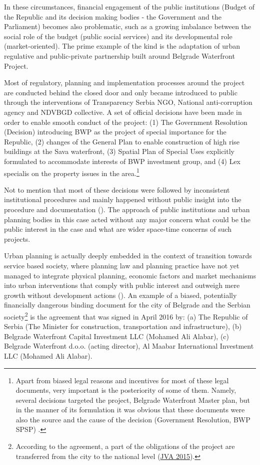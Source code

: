 \documentclass[11pt]{report}
\begin{document}
In these circumstances, financial engagement of the public institutions (Budget of the Republic and its decision making bodies - the Government and the Parliament) becomes also problematic, such as a growing imbalance between the social role of the budget (public social services) and its developmental role (market-oriented).
The prime example of the kind is the adaptation of urban regulative and public-private partnership built around Belgrade Waterfront Project.

Most of regulatory, planning and implementation processes around the project are conducted behind the closed door and only became introduced to public through the interventions of Transparency Serbia NGO, National anti-corruption agency and NDVBGD collective.
A set of official decisions have been made in order to enable smooth conduct of the project:
(1) The Government Resolution (Decision) introducing BWP as the project of special importance for the Republic,
(2) changes of the General Plan to enable construction of high rise buildings at the Sava waterfront,
(3) Spatial Plan of Special Uses explicitly formulated to accommodate interests of BWP investment group,
and
(4) Lex specialis on the property issues in the area.\footnote{Apart from biased legal reasons and incentives for most of these legal documents, very important is the posteriority of some of them. Namely, several decisions targeted the project, Belgrade Waterfront Master plan, but in the manner of its formulation it was obvious that these documents were also the source and the cause of the decision (Government Resolution, BWP SPSP) \cite{Alternativni izvestaj}.}

Not to mention that most of these decisions were followed by inconsistent institutional procedures and mainly happened without public insight into the procedure and documentation (\cite{alternativni izvestaj}).
The approach of public institutions and urban planning bodies in this case acted without any major concern what could be the public interest in the case and what are wider space-time concerns of such projects.

Urban planning is actually deeply embedded in the context of transition towards service based society, where planning law and planning practice have not yet managed to integrate physical planning, economic factors and market mechanisms into urban interventions that comply with public interest and outweigh mere growth without development actions (\cite{Vujosevic 2012}).
An example of a biased, potentially financially dangerous binding document for the city of Belgrade and the Serbian society\footnote{
According to the agreement, a part of the obligations of the project are transferred from the city to the national level (\href{}{JVA 2015}).}
is the agreement that was signed in April 2016 by:
(a) The Republic of Serbia (The Minister for construction, transportation and infrastructure),
(b) Belgrade Waterfront Capital Investment LLC (Mohamed Ali Alabar),
(c) Belgrade Waterfront d.o.o. (acting director),
Al Maabar International Investment LLC (Mohamed Ali Alabar).
\end{document}
